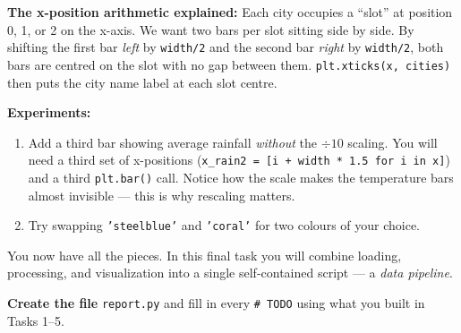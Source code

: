 \documentclass{cslab}
\begin{document}
\begin{note}
\textbf{The x-position arithmetic explained:} Each city occupies a ``slot'' at position 0, 1, or 2 on the x-axis. We want two bars per slot sitting side by side. By shifting the first bar \emph{left} by \texttt{width/2} and the second bar \emph{right} by \texttt{width/2}, both bars are centred on the slot with no gap between them. \texttt{plt.xticks(x, cities)} then puts the city name label at each slot centre.
\end{note}

\textbf{Experiments:}
\begin{enumerate}
    \item Add a third bar showing average rainfall \emph{without} the \(\div 10\) scaling. You will need a third set of x-positions (\texttt{x\_rain2 = [i + width * 1.5 for i in x]}) and a third \texttt{plt.bar()} call. Notice how the scale makes the temperature bars almost invisible --- this is why rescaling matters.
    \item Try swapping \texttt{'steelblue'} and \texttt{'coral'} for two colours of your choice.
\end{enumerate}


You now have all the pieces. In this final task you will combine loading, processing, and visualization into a single self-contained script --- a \emph{data pipeline}.

\textbf{Create the file} \texttt{report.py} and fill in every \texttt{\# TODO} using what you built in Tasks 1--5.
\end{document}

